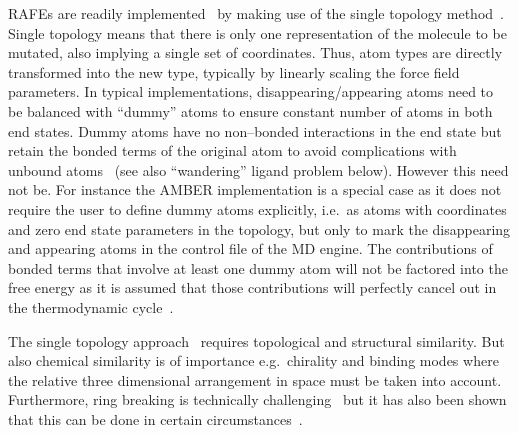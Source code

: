 \documentclass[journal=jctcce,manuscript=article]{achemso}
\begin{document}
RAFEs are readily implemented~\cite{doi:10.1021/j100056a020, Michel2010} by 
making use of the single topology method~\cite{doi:10.1063/1.449208,
doi:10.1021/j100056a020, doi:10.1021/jp981628n}.  Single topology means that 
there is only one representation of the molecule to be mutated, also implying a 
single set of coordinates.
Thus, atom types are directly transformed into the new type,
typically by linearly scaling the force field parameters.
In typical implementations, disappearing/appearing atoms need to be balanced 
with ``dummy'' atoms to ensure 
constant number of atoms in both end states.  Dummy atoms have no non--bonded 
interactions in the end state but retain the bonded terms of the original atom 
to avoid complications with unbound atoms~\cite{doi:10.1021/jp981628n} (see 
also ``wandering'' ligand problem below).  However this need not be. 
For instance the AMBER implementation  is a special case as it does not require the user to define dummy atoms 
explicitly, i.e.\ as atoms with coordinates and zero end state parameters in 
the topology, but only 
to mark the disappearing and appearing atoms in the control file of the 
MD engine.  The contributions of bonded terms that involve at least one 
dummy atom will not be factored into the free energy as it is assumed that 
those contributions will perfectly cancel out in the thermodynamic 
cycle~\cite{doi:10.1021/acs.jcim.5b00057, doi:10.1021/jp994193s}.

The single topology approach~\cite{doi:10.1021/j100056a020} requires
topological and structural similarity.
But also chemical similarity is of importance e.g.\ chirality and binding modes 
where the relative three dimensional arrangement in space must be taken into 
account.  Furthermore, ring breaking is technically
challenging~\cite{doi:10.1021/acs.jctc.6b00991} but it has also been
shown that this can be done in certain 
circumstances~\cite{doi:10.1021/acs.jcim.5b00057,
  doi:10.1021/jp994193s}.
\end{document}
